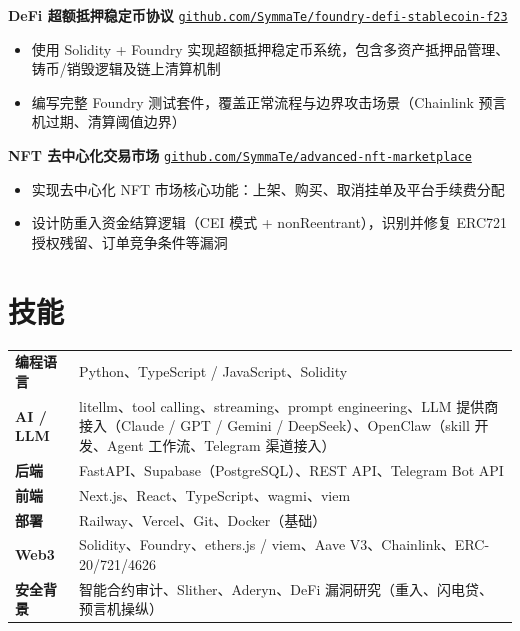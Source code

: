 \documentclass[9.5pt, a4paper]{article}
\begin{document}
\vspace{3pt}
\noindent\textbf{DeFi 超额抵押稳定币协议} \hfill
\href{https://github.com/SymmaTe/foundry-defi-stablecoin-f23}{\small\texttt{github.com/SymmaTe/foundry-defi-stablecoin-f23}}

\begin{itemize}
  \item 使用 Solidity + Foundry 实现超额抵押稳定币系统，包含多资产抵押品管理、铸币/销毁逻辑及链上清算机制
  \item 编写完整 Foundry 测试套件，覆盖正常流程与边界攻击场景（Chainlink 预言机过期、清算阈值边界）
\end{itemize}

\vspace{3pt}
\noindent\textbf{NFT 去中心化交易市场} \hfill
\href{https://github.com/SymmaTe/advanced-nft-marketplace}{\small\texttt{github.com/SymmaTe/advanced-nft-marketplace}}

\begin{itemize}
  \item 实现去中心化 NFT 市场核心功能：上架、购买、取消挂单及平台手续费分配
  \item 设计防重入资金结算逻辑（CEI 模式 + nonReentrant），识别并修复 ERC721 授权残留、订单竞争条件等漏洞
\end{itemize}


\section{技能}

\begin{tabularx}{\textwidth}{@{} l X @{}}
  \textbf{编程语言}   & Python、TypeScript / JavaScript、Solidity\\[6pt]
  \textbf{AI / LLM}   & litellm、tool calling、streaming、prompt engineering、LLM 提供商接入（Claude / GPT / Gemini / DeepSeek）、OpenClaw（skill 开发、Agent 工作流、Telegram 渠道接入）\\[6pt]
  \textbf{后端}       & FastAPI、Supabase（PostgreSQL）、REST API、Telegram Bot API\\[6pt]
  \textbf{前端}       & Next.js、React、TypeScript、wagmi、viem\\[6pt]
  \textbf{部署}       & Railway、Vercel、Git、Docker（基础）\\[6pt]
  \textbf{Web3}       & Solidity、Foundry、ethers.js / viem、Aave V3、Chainlink、ERC-20/721/4626\\[6pt]
  \textbf{安全背景}   & 智能合约审计、Slither、Aderyn、DeFi 漏洞研究（重入、闪电贷、预言机操纵）\\
\end{tabularx}
\end{document}
